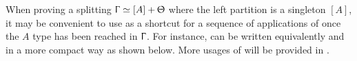 When proving a splitting $\Upgamma \simeq [A] + \Uptheta$ where the left
partition is a singleton $[A]$, it may be convenient to use  as
a shortcut for a sequence of applications of \AgdaInductiveConstructor{>} once
the $A$ type has been reached in $\Upgamma$. For instance,
 can be written equivalently and in a more
compact way as shown below. More usages of  will be provided in
.

\begin{code}[hide]%
\>[0]\AgdaSpace{}%
\AgdaModule{\AgdaUnderscore{}}\AgdaSpace{}%
\<%
\end{code}
\begin{code}%
\>[0][@{}l@{\AgdaIndent{1}}]%
\>[2]\AgdaSpace{}%
\AgdaSymbol{:}\AgdaSpace{}%
\AgdaSymbol{(}\AgdaSpace{}%
\AgdaSpace{}%
\AgdaSpace{}%
\AgdaSpace{}%
\AgdaSpace{}%
\AgdaSpace{}%
\AgdaSpace{}%
\AgdaSpace{}%
\AgdaInductiveConstructor{[]}\AgdaSymbol{)}\AgdaSpace{}%
\AgdaSpace{}%
\AgdaOperator{\AgdaFunction{[}}\AgdaSpace{}%
\AgdaSpace{}%
\AgdaOperator{\AgdaFunction{]}}\AgdaSpace{}%
\AgdaOperator{\AgdaDatatype{+}}\AgdaSpace{}%
\AgdaSymbol{(}\AgdaSpace{}%
\AgdaSpace{}%
\AgdaSpace{}%
\AgdaSpace{}%
\AgdaSpace{}%
\AgdaSpace{}%
\AgdaInductiveConstructor{[]}\AgdaSymbol{)}\<%
\\
%
\>[2]\AgdaSpace{}%
\AgdaSymbol{=}\AgdaSpace{}%
\AgdaOperator{\AgdaInductiveConstructor{>}}\AgdaSpace{}%
\AgdaOperator{\AgdaInductiveConstructor{<}}\AgdaSpace{}%
\<%
\end{code}

